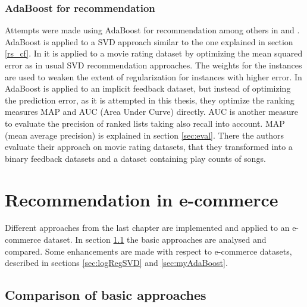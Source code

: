 \documentclass[10pt]{reportMaster}
\begin{document}
\subsection{AdaBoost for recommendation}
\label{sec:adaBoostForRecommendation}
Attempts were made using AdaBoost for recommendation among others in \cite{boostingCFRatings} and \cite{boostingAUC}.
AdaBoost is applied to a SVD approach similar to the one explained in section \ref{rs_cf}.
In \cite{boostingCFRatings} it is applied to a movie rating dataset by optimizing the mean squared error as in usual SVD recommendation approaches.
The weights for the instances are used to weaken the extent of regularization for instances with higher error.
In \cite{boostingAUC} AdaBoost is applied to an implicit feedback dataset, but instead of optimizing the prediction error, as it is attempted in this thesis, they optimize the ranking measures MAP and AUC (Area Under Curve) directly.
AUC is another measure to evaluate the precision of ranked lists taking also recall into account.
MAP (mean average precision) is explained in section \ref{sec:eval}.
There the authors evaluate their approach on movie rating datasets, that they transformed into a binary feedback datasets and a dataset containing play counts of songs.











\chapter{Recommendation in e-commerce}
\label{sec:ecommerceRec}

Different approaches from the last chapter are implemented and applied to an e-commerce dataset.
In section \ref{sec:comparison} the basic approaches are analysed and compared.
Some enhancements are made with respect to e-commerce datasets, described in sections \ref{sec:logRegSVD} and \ref{sec:myAdaBoost}.


\section{Comparison of basic approaches}
\label{sec:comparison}
\end{document}
